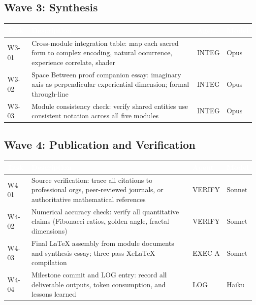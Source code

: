 \documentclass[11pt,letterpaper]{article}
\newcommand{\tableheader}[1]{\textbf{\sffamily\textcolor{white}{#1}}}
\begin{document}
\subsection{Wave 3: Synthesis}

\begin{center}
\begin{tabularx}{\textwidth}{L{2cm}XL{2cm}C{2cm}}
\toprule
{}
\tableheader{Task} & \tableheader{Description} & \tableheader{Agent} & \tableheader{Model} \\
\midrule
W3-01 & Cross-module integration table: map each sacred form to complex encoding, natural occurrence, experience correlate, shader & INTEG & Opus \\
W3-02 & Space Between proof companion essay: imaginary axis as perpendicular experiential dimension; formal through-line & INTEG & Opus \\
W3-03 & Module consistency check: verify shared entities use consistent notation across all five modules & INTEG & Opus \\
\bottomrule
\end{tabularx}
\end{center}

\subsection{Wave 4: Publication and Verification}

\begin{center}
\begin{tabularx}{\textwidth}{L{2cm}XL{2cm}C{2cm}}
\toprule
{}
\tableheader{Task} & \tableheader{Description} & \tableheader{Agent} & \tableheader{Model} \\
\midrule
W4-01 & Source verification: trace all citations to professional orgs, peer-reviewed journals, or authoritative mathematical references & VERIFY & Sonnet \\
W4-02 & Numerical accuracy check: verify all quantitative claims (Fibonacci ratios, golden angle, fractal dimensions) & VERIFY & Sonnet \\
W4-03 & Final LaTeX assembly from module documents and synthesis essay; three-pass XeLaTeX compilation & EXEC-A & Sonnet \\
W4-04 & Milestone commit and LOG entry: record all deliverable outputs, token consumption, and lessons learned & LOG & Haiku \\
\bottomrule
\end{tabularx}
\end{center}
\end{document}
